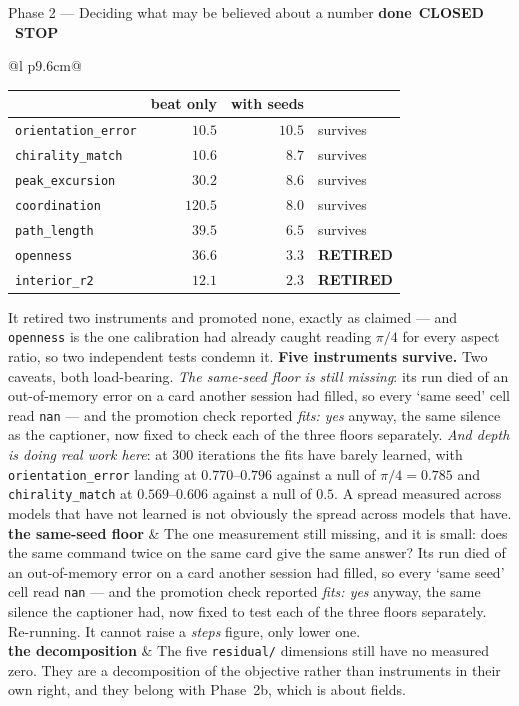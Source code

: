\documentclass[11pt,a4paper]{article}
\newcommand{\code}[1]{\texttt{#1}}
\newcommand{\dn}{\textcolor{good}{\textbf{done}}}
\newcommand{\stopp}{\textcolor{bad!30!white}{\textbf{STOP}}}
\begin{document}
\begin{phasebox}{Phase 2 --- Deciding what may be believed about a number \hfill \dn\ \textbf{CLOSED} \ \stopp}
\begin{center}
\begin{tabular}{@{}l p{9.6cm}@{}}
\smallskip
\begin{tabular}{@{}l r r l@{}}
\toprule
& \textbf{beat only} & \textbf{with seeds} & \\
\midrule
\code{orientation\_error} & $10.5$ & $\mathbf{10.5}$ & survives\\
\code{chirality\_match} & $10.6$ & $\mathbf{8.7}$ & survives\\
\code{peak\_excursion} & $30.2$ & $\mathbf{8.6}$ & survives\\
\code{coordination} & $120.5$ & $\mathbf{8.0}$ & survives\\
\code{path\_length} & $39.5$ & $\mathbf{6.5}$ & survives\\
\code{openness} & $36.6$ & $3.3$ & \textbf{RETIRED}\\
\code{interior\_r2} & $12.1$ & $2.3$ & \textbf{RETIRED}\\
\bottomrule
\end{tabular}
\smallskip

It retired two instruments and promoted none, exactly as claimed --- and \code{openness} is the one
calibration had already caught reading $\pi/4$ for every aspect ratio, so two independent tests
condemn it. \textbf{Five instruments survive.} Two caveats, both load-bearing. \emph{The same-seed
floor is still missing}: its run died of an out-of-memory error on a card another session had filled,
so every `same seed' cell read \code{nan} --- and the promotion check reported \emph{fits: yes}
anyway, the same silence as the captioner, now fixed to check each of the three floors separately.
\emph{And depth is doing real work here}: at 300 iterations the fits have barely learned, with
\code{orientation\_error} landing at $0.770$--$0.796$ against a null of $\pi/4 = 0.785$ and
\code{chirality\_match} at $0.569$--$0.606$ against a null of $0.5$. A spread measured across models
that have not learned is not obviously the spread across models that have.\\
\addlinespace
\textbf{the same-seed floor} & The one measurement still missing, and it is small: does the same
command twice on the same card give the same answer? Its run died of an out-of-memory error on a
card another session had filled, so every `same seed' cell read \code{nan} --- and the promotion
check reported \emph{fits: yes} anyway, the same silence the captioner had, now fixed to test each
of the three floors separately. Re-running. It cannot raise a \emph{steps} figure, only lower one.\\
\addlinespace
\textbf{the decomposition} & The five \code{residual/} dimensions still have no measured zero. They
are a decomposition of the objective rather than instruments in their own right, and they belong
with Phase~2b, which is about fields.\\
\bottomrule
\end{tabular}
\end{center}


\end{phasebox}
\end{document}
